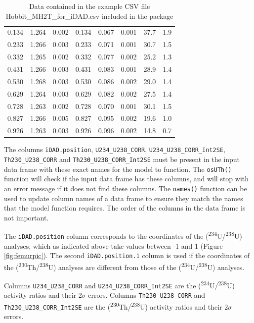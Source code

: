 \documentclass[]{elsarticle} %
\begin{document}
\begin{table}[ht]
\begin{tabular}{cccccccc}
  0.134 & 1.264 & 0.002 & 0.134 & 0.067 & 0.001 & 37.7 & 1.9 \\ 
  0.233 & 1.266 & 0.003 & 0.233 & 0.071 & 0.001 & 30.7 & 1.5 \\ 
  0.332 & 1.265 & 0.002 & 0.332 & 0.077 & 0.002 & 25.2 & 1.3 \\ 
  0.431 & 1.266 & 0.003 & 0.431 & 0.083 & 0.001 & 28.9 & 1.4 \\ 
  0.530 & 1.268 & 0.003 & 0.530 & 0.086 & 0.002 & 29.0 & 1.4 \\ 
  0.629 & 1.264 & 0.003 & 0.629 & 0.082 & 0.002 & 27.5 & 1.4 \\ 
  0.728 & 1.263 & 0.002 & 0.728 & 0.070 & 0.001 & 30.1 & 1.5 \\ 
  0.827 & 1.266 & 0.005 & 0.827 & 0.095 & 0.002 & 19.6 & 1.0 \\ 
  0.926 & 1.263 & 0.003 & 0.926 & 0.096 & 0.002 & 14.8 & 0.7 \\ 
   \hline
\end{tabular}
\caption{\label{tab:hobbitone}Data contained in the example CSV file Hobbit\_MH2T\_for\_iDAD.csv included in the package} 
\end{table}

The columns \texttt{iDAD.position}, \texttt{U234\_U238\_CORR}, \texttt{U234\_U238\_CORR\_Int2SE}, \texttt{Th230\_U238\_CORR} and \texttt{Th230\_U238\_CORR\_Int2SE} must be present in the input data frame with these exact names for the model to function. The \texttt{osUTh()} function will check if the input data frame has these columns, and will stop with an error message if it does not find these columns. The \texttt{names()} function can be used to update column names of a data frame to ensure they match the names that the model function requires. The order of the columns in the data frame is not important.

The \texttt{iDAD.position} column corresponds to the coordinates of the (\textsuperscript{234}U/\textsuperscript{238}U) analyses, which as indicated above take values between -1 and 1 (Figure \ref{fig:femurpic}). The second \texttt{iDAD.position.1} column is used if the coordinates of the (\textsuperscript{230}Th/\textsuperscript{238}U) analyses are different from those of the (\textsuperscript{234}U/\textsuperscript{238}U) analyses.

Columns \texttt{U234\_U238\_CORR} and \texttt{U234\_U238\_CORR\_Int2SE} are the (\textsuperscript{234}U/\textsuperscript{238}U) activity ratios and their 2\(\sigma\) errors. Columns \texttt{Th230\_U238\_CORR} and
\texttt{Th230\_U238\_CORR\_Int2SE} are the (\textsuperscript{230}Th/\textsuperscript{238}U) activity ratios and their 2\(\sigma\) errors.
\end{document}
